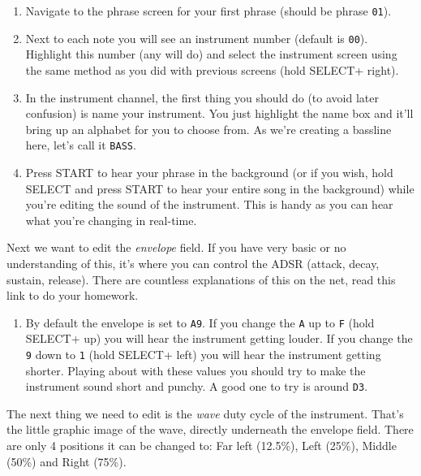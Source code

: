\documentclass[]{article}
\newcommand{\buttonStyle}[1]{\textsf{#1}\xspace}
\newcommand{\bStart}{\buttonStyle{{START}}}
\newcommand{\bSelect}{\buttonStyle{{SELECT}}}
\newcommand{\bRight}{\buttonStyle{right}}
\newcommand{\bLeft}{\buttonStyle{left}}
\newcommand{\bUp}{\buttonStyle{up}}
\newcommand{\nb}[1]{\texttt{#1}\xspace}
\begin{document}
\begin{enumerate}
	
\item Navigate to the phrase screen for your first phrase (should be phrase \nb{01}).

\item Next to each note you will see an instrument number (default is \nb{00}). Highlight this number (any will do) and select the instrument screen using the same method as you did with previous screens (hold \bSelect + \bRight).

\item In the instrument channel, the first thing you should do (to avoid later confusion) is name your instrument. You just highlight the name box and it'll bring up an alphabet for you to choose from. As we're creating a bassline here, let's call it \nb{BASS}.

\item Press \bStart to hear your phrase in the background (or if you wish, hold \bSelect and press \bStart to hear your entire song in the background) while you're editing the sound of the instrument. This is handy as you can hear what you're changing in real-time.

\end{enumerate}

Next we want to edit the \textit{envelope} field. If you have very basic or no understanding of this, it's where you can control the ADSR (attack, decay, sustain, release). There are countless explanations of this on the net, read this link to do your homework.

\begin{enumerate}[resume]

\item By default the envelope is set to \nb{A9}. If you change the \nb{A} up to \nb{F} (hold \bSelect + \bUp) you will hear the instrument getting louder. If you change the \nb{9} down to \nb{1} (hold \bSelect + \bLeft) you will hear the instrument getting shorter. Playing about with these values you should try to make the instrument sound short and punchy. A good one to try is around \nb{D3}.

\end{enumerate}

The next thing we need to edit is the \textit{wave} duty cycle of the instrument. That's the little graphic image of the wave, directly underneath the envelope field. There are only 4 positions it can be changed to: Far left (12.5\%), Left (25\%), Middle (50\%) and Right (75\%). 
\end{document}
